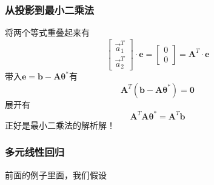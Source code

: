 \documentclass[14pt]{beamer}
\newcommand{\mat}[1]{\bm{#1}}
\renewcommand{\vec}[1]{\bm{#1}}
\newcommand{\MA}{\mat{A}}
\newcommand{\Va}{\Vec{a}}
\newcommand{\Vb}{\vec{b}}
\newcommand{\Ve}{\vec{e}}
\newcommand{\Vzero}{\vec{0}}
\newcommand{\Vt}{\vec{\theta}}
\begin{document}
    \begin{frame}
        \frametitle{从投影到最小二乘法}
        将两个等式重叠起来有
        \begin{equation}
            \begin{bmatrix}
                \Va_1^T\\
                \Va_2^T
            \end{bmatrix}\cdot
            \Ve=\begin{bmatrix}
                0\\
                0
            \end{bmatrix}=
            \MA^T\cdot \Ve
        \end{equation}
        带入$\Ve=\Vb-\MA\Vt^*$有
        \begin{equation}
            \MA^T(\Vb-\MA\Vt^*)=\Vzero
        \end{equation}
        展开有
        \[ \boxed{\MA^T\MA\Vt^*=\MA^T\Vb} \]
        正好是最小二乘法的解析解！
    \end{frame}

    \begin{frame}
        \frametitle{多元线性回归}
        前面的例子里面，我们假设
        
    
    \end{frame}
\end{document}
